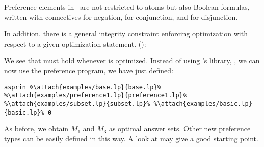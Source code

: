 \begin{note}
Preference elements in \asprin\ are not restricted to atoms 
but also Boolean formulas, written with connectives 
\code{\~} for negation, 
\code{\&} for conjunction,
and 
\code{|} for disjunction.
\eexample
\end{note}

In addition, 
there is a general integrity constraint enforcing optimization with respect to a given optimization statement.
():
%

%
We see that  must hold whenever  is optimized. 
Instead of using \asprin's library, , 
we can now use the preference program, we have just defined:
\begin{lstlisting}[numbers=none,escapechar=\%]
asprin %\attach{examples/base.lp}{base.lp}% %\attach{examples/preference1.lp}{preference1.lp}% %\attach{examples/subset.lp}{subset.lp}% %\attach{examples/basic.lp}{basic.lp}% 0
\end{lstlisting}
As before, we obtain $M_1$ and $M_3$ as optimal answer sets.
Other new preference types can be easily defined in this way.  
A look at  may give a good starting point. 

